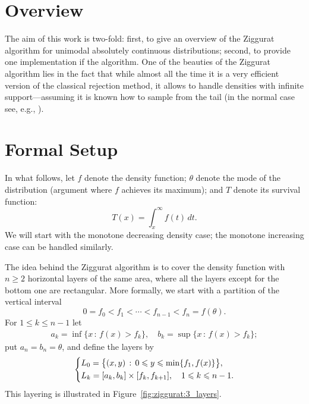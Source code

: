\documentclass{article}
\renewcommand{\geq}{\geqslant}
\renewcommand{\leq}{\leqslant}
\theoremstyle{definition} %
\newcommand{\Mode}{\theta}
\begin{document}
\section{Overview}

The aim of this work is two-fold: first, to give an overview of the Ziggurat algorithm \citet{Marsaglia+Tsang} for unimodal absolutely continuous distributions; second, to provide one implementation if the algorithm. One of the beauties of the Ziggurat algorithm lies in the fact that while almost all the time it is a very efficient version of the classical rejection method, it allows to handle densities with infinite support---assuming it is known how to sample from the tail (in the normal case see, e.g., \citet{Marsaglia:64}).

\section{Formal Setup}

In what follows, let $f$ denote the density function; $\Mode $ denote the mode of the distribution (argument where $f$ achieves its maximum); and $T$ denote its survival function:
\[
    T(x) = \int _x ^{\infty} f(t) \,dt.
\]
We will start with the monotone decreasing density case; the monotone increasing case can be handled similarly.


The idea behind the Ziggurat algorithm is to cover the density function with $n \geq 2$ horizontal layers of the same area, where all the layers except for the bottom one are rectangular.
%
More formally, we start with a partition of the vertical interval
\[
    0 = f_0 < f_1 < \cdots < f_{n - 1} < f_{n} = f(\Mode ).
\]
For $1 \leq k \leq n - 1$ let
\begin{align*}
    a_k = \inf \big\{ x \,:\, f(x) > f_k \big\}, \quad
    b_k = \sup \big\{ x \,:\, f(x) > f_k \big\};
\end{align*}
put $a_n = b_n = \Mode $, and define the layers by
\begin{align*}
    \begin{dcases}
        L_0 = \big\{ (x, y) \,:\, 0 \leq y \leq \min \{f_1, f(x)\} \big\}, \\
        L_k = [a_k, b_k] \times [f_k, f_{k + 1}], \quad 1 \leq k \leq n - 1.
    \end{dcases}
\end{align*}
This layering is illustrated in Figure~\ref{fig:ziggurat:3_layers}.
\end{document}
